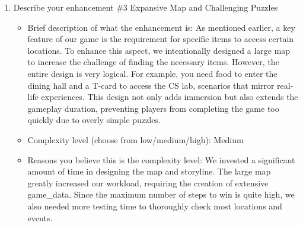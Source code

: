 \documentclass[11pt]{article}
\begin{document}
\begin{enumerate}
    \item Describe your enhancement \#3 Expansive Map and Challenging Puzzles
    \begin{itemize}
        \item Brief description of what the enhancement is: As mentioned earlier, a key feature of our game is the requirement for specific items to access certain locations. To enhance this aspect, we intentionally designed a large map to increase the challenge of finding the necessary items. However, the entire design is very logical. For example, you need food to enter the dining hall and a T-card to access the CS lab, scenarios that mirror real-life experiences. This design not only adds immersion but also extends the gameplay duration, preventing players from completing the game too quickly due to overly simple puzzles.
        \item Complexity level (choose from low/medium/high): Medium
        \item Reasons you believe this is the complexity level: We invested a significant amount of time in designing the map and storyline. The large map greatly increased our workload, requiring the creation of extensive game\_data. Since the maximum number of steps to win is quite high, we also needed more testing time to thoroughly check most locations and events.
    \end{itemize}    


\end{enumerate}
\end{document}
